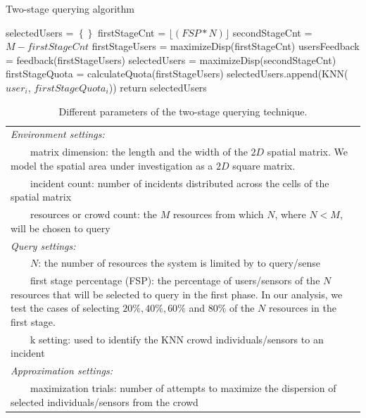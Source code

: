 \documentclass{acm_proc_article-sp}
\newcommand\floor[1]{\lfloor#1\rfloor}
\newcommand{\tabitem}{~~\llap{\textbullet}~~}
\begin{document}
\begin{algorithm}
\caption{Two-stage querying algorithm}
\label{TSalgorithm}
  \begin{algorithmic}[1]
          \State selectedUsers = $\left\{\right\}$
          \State firstStageCnt = $\floor{(FSP*N)}$
          \State secondStageCnt = $M - firstStageCnt$
          \State firstStageUsers = maximizeDisp(firstStageCnt)
          \State usersFeedback = feedback(firstStageUsers)
                 \State selectedUsers = maximizeDisp(secondStageCnt){}
          \Else
          \EndIf  
        \State firstStageQuota = calculateQuota(firstStageUsers)
      \State selectedUsers.append(KNN($user_i$, $firstStageQuota_i$))
    \EndFor
\State return {selectedUsers}
\EndFunction
\end{algorithmic}
\end{algorithm}

\begin{table}{}
\centering
\begin{tabulary}{0.5\textwidth}{|L|}
\hline
\textit{Environment settings: }\\
\tabitem matrix dimension: the length and
the width of the $2D$ spatial matrix. We model the spatial area under investigation as a $2D$ square matrix.\\
\tabitem incident count: number of incidents distributed across the cells of the spatial matrix\\
\tabitem resources or crowd count: the $M$ resources from which $N$, where $N < M$, will be chosen to query\\
\hline
\textit{Query settings:}\\
\tabitem $N$: the number of resources the system is limited by to query/sense \\
\tabitem first stage percentage (FSP): the percentage of users/sensors of the $N$ resources that will be selected to query in the first phase. In our analysis, we test the cases of selecting $20\%, 40\%, 60\%$ and $80\%$ of the $N$ resources in the first stage.\\
\tabitem k setting: used to identify the KNN crowd individuals/sensors to an incident\\
\hline
\textit{Approximation settings: }\\
\tabitem maximization trials: number of attempts to maximize the dispersion of selected individuals/sensors from the crowd\\
\hline
\end{tabulary}
\caption{Different parameters of the two-stage querying technique.}
\label{table:systemParameters}
\end{table}
\end{document}
